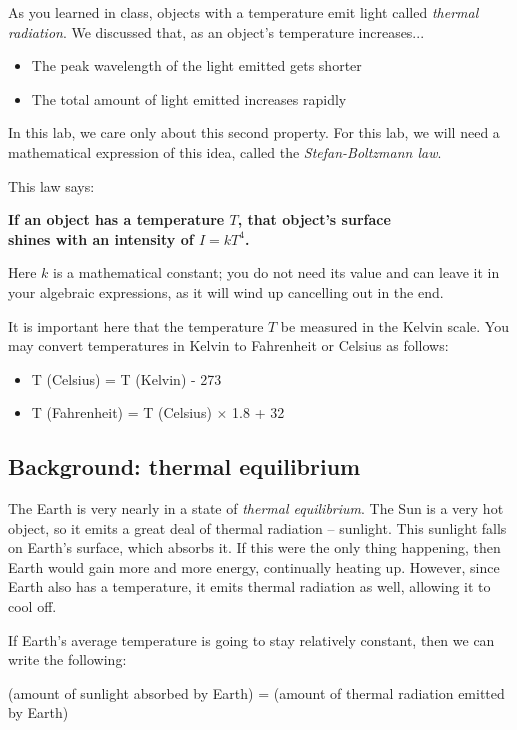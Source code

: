 \documentclass[11pt]{article}
\def\BI{\begin{itemize}}
\def\EI{\end{itemize}}
\begin{document}
As you learned in class, objects with a temperature emit light called {\it thermal radiation}. We discussed that, as an object's temperature increases...

\BI
\item The peak wavelength of the light emitted gets shorter
\item The total amount of light emitted increases rapidly
\EI

In this lab, we care only about this second property. For this lab, we will need a mathematical expression of this idea, called the {\it Stefan-Boltzmann law}.

This law says:

\begin{center}

{\bf If an object has a temperature $T$, that object's surface\\ shines with an intensity of $I=kT^4$.}

\end{center}

Here $k$ is a mathematical constant; you do not need its value and can leave it in your algebraic expressions, as it will wind up cancelling out in the end. 

It is important here that the temperature $T$ be measured in the Kelvin scale. You may convert temperatures in Kelvin to Fahrenheit or Celsius as follows:

\BI
\item T (Celsius) = T (Kelvin) - 273
\item T (Fahrenheit) = T (Celsius) $\times$ 1.8 + 32
\EI

\subsection*{Background: thermal equilibrium}

The Earth is very nearly in a state of {\it thermal equilibrium}. The Sun is a very hot object, so it emits a great deal of thermal radiation -- sunlight. 
This sunlight falls on Earth's surface, which absorbs it. If this were the only thing happening, then Earth would gain more
and more energy, continually heating up. However, since Earth also has a temperature, it emits thermal radiation as well, allowing it to cool off.

If Earth's average temperature is going to stay relatively constant, then we can write the following:

\begin{center}
{(amount of sunlight absorbed by Earth) = (amount of thermal radiation emitted by Earth)}
\end{center}
\end{document}

